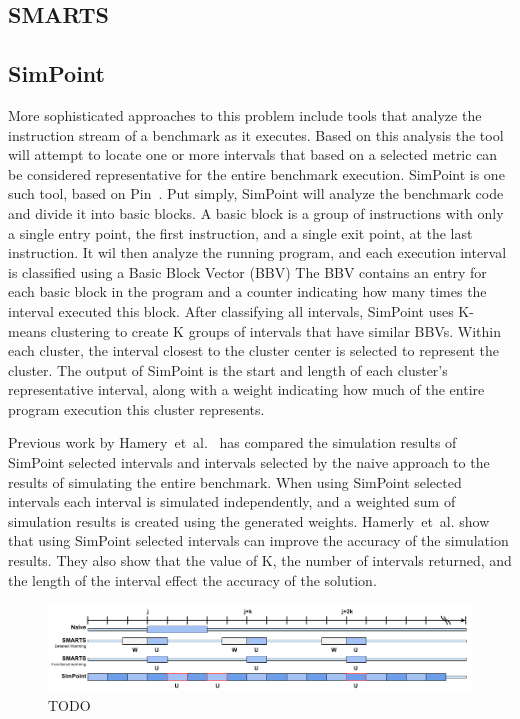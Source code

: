 \subsection{SMARTS}

\subsection{SimPoint}
More sophisticated approaches to this problem include tools that analyze the instruction stream of a benchmark as it executes.
Based on this analysis the tool will attempt to locate one or more intervals that based on a selected metric can be considered representative for the entire benchmark execution.
SimPoint\cite{Hamerly2005} is one such tool, based on Pin~\cite{Luk2005}.
Put simply, SimPoint will analyze the benchmark code and divide it into basic blocks.
A basic block is a group of instructions with only a single entry point, the first instruction, and a single exit point, at the last instruction.
It wil then analyze the running program, and each execution interval is classified using a Basic Block Vector (BBV)
The BBV contains an entry for each basic block in the program and a counter indicating how many times the interval executed this block.
After classifying all intervals, SimPoint uses K-means clustering to create K groups of intervals that have similar BBVs.
Within each cluster, the interval closest to the cluster center is selected to represent the cluster. 
The output of SimPoint is the start and length of each cluster's representative interval, along with a weight indicating how much of the entire program execution this cluster represents.

Previous work by Hamery~et~al.~\cite{Hamerly2004} has compared the simulation results of SimPoint selected intervals and intervals selected by the naive approach to the results of simulating the entire benchmark.
When using SimPoint selected intervals each interval is simulated independently, and a weighted sum of simulation results is created using the generated weights.
Hamerly~et~al. show that using SimPoint selected intervals can improve the accuracy of the simulation results. 
They also show that the value of K, the number of intervals returned, and the length of the interval effect the accuracy of the solution. 


\begin{figure}
\centering
\includegraphics[width=\textwidth]{figures/methodology/sample_extraction_tools}
\caption{TODO}
\label{fig:background:simpoint:sampleextract}

\end{figure}